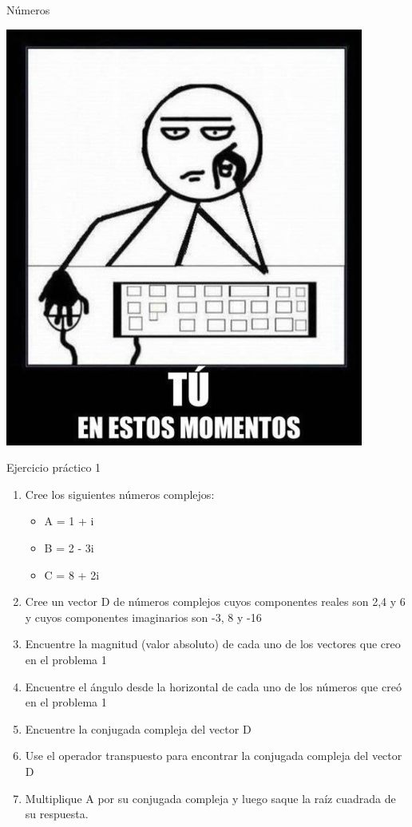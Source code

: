 \documentclass{bredelebeamer}
\begin{document}
\begin{frame}{Números}
\begin{center}
\includegraphics[scale=0.4]{images/img40.png}
\end{center}
\end{frame}

\begin{frame}{Ejercicio práctico 1}
\begin{enumerate}
\item Cree los siguientes números complejos:
\begin{itemize}
\item A = 1 + i
\item B = 2 - 3i
\item C = 8 + 2i
\end{itemize}
\item Cree un vector D de números complejos cuyos componentes reales son 2,4 y 6 y cuyos componentes imaginarios son -3, 8 y -16
\item Encuentre la magnitud (valor absoluto) de cada uno de los vectores que creo en el problema 1
\item Encuentre el ángulo desde la horizontal de cada uno de los números que creó en el problema 1
\item Encuentre la conjugada compleja del vector D
\item Use el operador transpuesto para encontrar la conjugada compleja del vector D
\item Multiplique A por su conjugada compleja y luego saque la raíz cuadrada de su respuesta.
\end{enumerate}
\end{frame}
\end{document}
